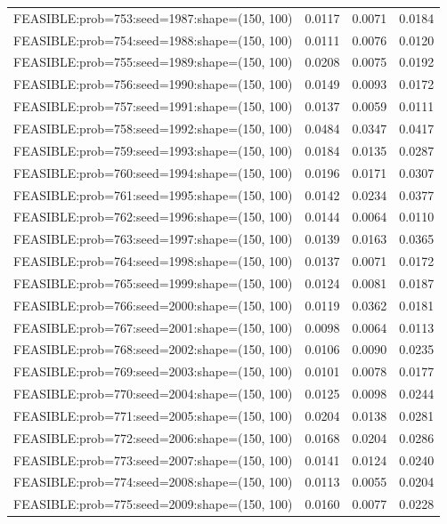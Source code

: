 \begin{longtable}{lccc}
FEASIBLE:prob=753:seed=1987:shape=(150, 100) &   0.0117 & 0.0071 & 0.0184 \\
FEASIBLE:prob=754:seed=1988:shape=(150, 100) &   0.0111 & 0.0076 & 0.0120 \\
FEASIBLE:prob=755:seed=1989:shape=(150, 100) &   0.0208 & 0.0075 & 0.0192 \\
FEASIBLE:prob=756:seed=1990:shape=(150, 100) &   0.0149 & 0.0093 & 0.0172 \\
FEASIBLE:prob=757:seed=1991:shape=(150, 100) &   0.0137 & 0.0059 & 0.0111 \\
FEASIBLE:prob=758:seed=1992:shape=(150, 100) &   0.0484 & 0.0347 & 0.0417 \\
FEASIBLE:prob=759:seed=1993:shape=(150, 100) &   0.0184 & 0.0135 & 0.0287 \\
FEASIBLE:prob=760:seed=1994:shape=(150, 100) &   0.0196 & 0.0171 & 0.0307 \\
FEASIBLE:prob=761:seed=1995:shape=(150, 100) &   0.0142 & 0.0234 & 0.0377 \\
FEASIBLE:prob=762:seed=1996:shape=(150, 100) &   0.0144 & 0.0064 & 0.0110 \\
FEASIBLE:prob=763:seed=1997:shape=(150, 100) &   0.0139 & 0.0163 & 0.0365 \\
FEASIBLE:prob=764:seed=1998:shape=(150, 100) &   0.0137 & 0.0071 & 0.0172 \\
FEASIBLE:prob=765:seed=1999:shape=(150, 100) &   0.0124 & 0.0081 & 0.0187 \\
FEASIBLE:prob=766:seed=2000:shape=(150, 100) &   0.0119 & 0.0362 & 0.0181 \\
FEASIBLE:prob=767:seed=2001:shape=(150, 100) &   0.0098 & 0.0064 & 0.0113 \\
FEASIBLE:prob=768:seed=2002:shape=(150, 100) &   0.0106 & 0.0090 & 0.0235 \\
FEASIBLE:prob=769:seed=2003:shape=(150, 100) &   0.0101 & 0.0078 & 0.0177 \\
FEASIBLE:prob=770:seed=2004:shape=(150, 100) &   0.0125 & 0.0098 & 0.0244 \\
FEASIBLE:prob=771:seed=2005:shape=(150, 100) &   0.0204 & 0.0138 & 0.0281 \\
FEASIBLE:prob=772:seed=2006:shape=(150, 100) &   0.0168 & 0.0204 & 0.0286 \\
FEASIBLE:prob=773:seed=2007:shape=(150, 100) &   0.0141 & 0.0124 & 0.0240 \\
FEASIBLE:prob=774:seed=2008:shape=(150, 100) &   0.0113 & 0.0055 & 0.0204 \\
FEASIBLE:prob=775:seed=2009:shape=(150, 100) &   0.0160 & 0.0077 & 0.0228 \\

\end{longtable}

